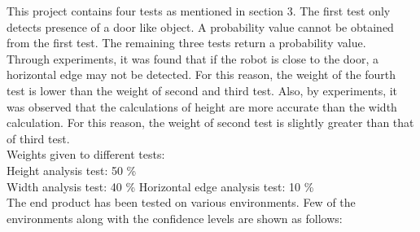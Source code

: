 \documentclass{report}
\begin{document}
This project contains four tests as mentioned in section 3. The first test only detects presence of a door like object. A probability
value cannot be obtained from the first test. The remaining three tests return a probability value. \\
Through experiments, it was found that
if the robot is close to the door, a horizontal edge may not be detected. For this reason, the weight of the fourth test is lower than the weight of second and third test.
Also, by experiments, it was observed that the calculations of height are more accurate than the width calculation. For this reason, the weight of
second test is slightly greater than that of third test.\\
Weights given to  different tests:\\
Height analysis test: 50 \% \\
Width analysis test: 40 \%
Horizontal edge analysis test: 10 \% \\
The end product has been tested on various environments. Few of the environments along with the confidence levels are shown as follows:
\end{document}
